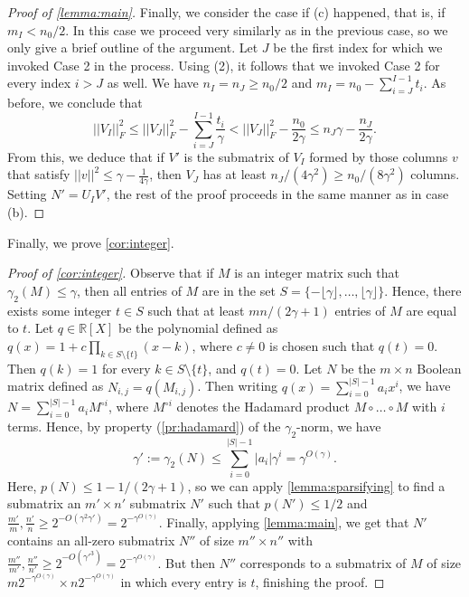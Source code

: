 \documentclass[11pt]{amsart}
\theoremstyle{plain}
\theoremstyle{definition}
\begin{document}
\begin{proof}[Proof of \cref{lemma:main}]
Finally, we consider the case if (c) happened, that is, if $m_I<n_0/2$. In this case we proceed very similarly as in the previous case, so we only give a brief outline of the argument. Let $J$ be the first index for which  we invoked Case 2 in the process. Using (2), it follows that we invoked Case 2 for every index $i>J$ as well. We have $n_I=n_J\geq n_0/2$ and $m_I=n_0-\sum_{i=J}^{I-1}t_i$. As before, we conclude that
$$||V_{I}||_F^2\leq ||V_J||_F^2-\sum_{i=J}^{I-1}\frac{t_i}{\gamma}<||V_J||_F^2-\frac{n_0}{2\gamma}\leq n_J\gamma-\frac{n_J}{2\gamma}.$$
From this, we deduce that if $V'$ is the submatrix of $V_I$ formed by those columns $v$ that satisfy $||v||^2\leq \gamma-\frac{1}{4\gamma}$, then $V_J$ has at least $n_J/(4\gamma^2)\geq n_0/(8\gamma^2)$ columns. Setting $N'=U_IV'$, the rest of the proof proceeds in the same manner as in case (b).
\end{proof}

Finally, we prove \cref{cor:integer}.

\begin{proof}[Proof of \cref{cor:integer}]
Observe that if $M$ is an integer matrix such that $\gamma_2(M)\leq \gamma$, then all entries of $M$ are in the set $S=\{-\lfloor\gamma\rfloor,\dots,\lfloor\gamma\rfloor\}$. Hence, there exists some integer $t\in S$ such that at least $mn/(2\gamma+1)$ entries of $M$ are equal to $t$. Let $q\in \mathbb{R}[X]$ be the polynomial defined as $q(x)=1+c\prod_{k\in S\setminus\{t\}}(x-k)$, where $c\neq 0$ is chosen such that $q(t)=0$. Then $q(k)=1$ for every $k\in S\setminus\{t\}$, and $q(t)=0$. Let $N$ be the $m\times n$ Boolean matrix defined as $N_{i,j}=q(M_{i,j})$. Then writing $q(x)=\sum_{i=0}^{|S|-1}a_ix^i$, we have $N=\sum_{i=0}^{|S|-1}a_i M^{\circ i}$, where $M^{\circ i}$ denotes the Hadamard product $M\circ\dots\circ M$ with $i$ terms. Hence, by property (\ref{pr:hadamard}) of the $\gamma_2$-norm, we have 
$$\gamma':=\gamma_2(N)\leq \sum_{i=0}^{|S|-1}|a_i|\gamma^i=\gamma^{O(\gamma)}.$$
Here, $p(N)\leq 1-1/(2\gamma+1)$, so we can apply  \cref{lemma:sparsifying} to find a submatrix an $m'\times n'$ submatrix $N'$ such that $p(N')\leq 1/2$ and $\frac{m'}{m},\frac{n'}{n}\geq 2^{-O(\gamma^2 \gamma')}=2^{-\gamma^{O(\gamma)}}$. Finally, applying \cref{lemma:main}, we get that $N'$ contains an all-zero submatrix $N''$ of size $m''\times n''$ with $\frac{m''}{m'},\frac{n''}{n'}\geq 2^{-O(\gamma'^3)}=2^{-\gamma^{O(\gamma)}}$. But then $N''$ corresponds to a submatrix of $M$ of size $m2^{-\gamma^{O(\gamma)}}\times n2^{-\gamma^{O(\gamma)}}$ in which every entry is $t$, finishing the proof.
\end{proof}
\end{document}
